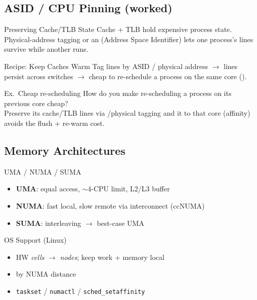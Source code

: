 \subsection{ASID / CPU Pinning (worked)}

\begin{definition}{Preserving Cache/TLB State}
    Cache + TLB hold expensive process state. Physical-address tagging or an  (Address Space Identifier) lets one process's lines survive while another runs.
\end{definition}

\begin{KR}{Recipe: Keep Caches Warm}
    Tag lines by ASID / physical address $\to$ lines persist across switches $\to$ cheap to re-schedule a process on the same core ().
\end{KR}

\begin{example2}{Ex.\ Cheap re-scheduling}
    How do you make re-scheduling a process on its previous core cheap?
     \\ 
    Preserve its cache/TLB lines via /physical tagging and  it to that core (affinity) avoids the flush + re-warm cost.
\end{example2}

\subsection{Memory Architectures}


\begin{definition}{UMA / NUMA / SUMA}
    \begin{itemize}
        \item \textbf{UMA}: equal access, $\sim$4-CPU limit, L2/L3 buffer
        \item \textbf{NUMA}: fast local, slow remote via interconnect (ccNUMA)
        \item \textbf{SUMA}: interleaving $\to$ best-case UMA
    \end{itemize}
\end{definition}

\begin{concept}{OS Support (Linux)}
    \begin{itemize}
        \item HW \emph{cells} $\to$ \emph{nodes}; keep work + memory local
        \item {} by NUMA distance
        \item \texttt{taskset} / \texttt{numactl} / \texttt{sched\_setaffinity}
    \end{itemize}
\end{concept}

